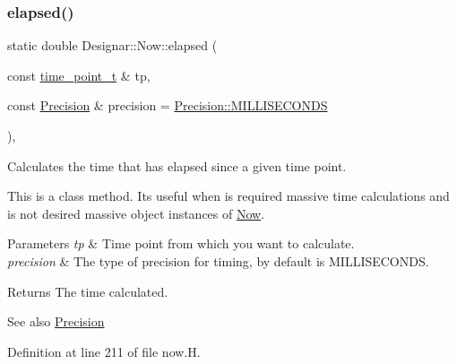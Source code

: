 \mbox{\label{class_designar_1_1_now_a04cc67e3245b662b33b25a6eefe7e957}} 
\subsubsection{\texorpdfstring{elapsed()}{elapsed()}\hspace{0.1cm}{\footnotesize\ttfamily [2/2]}}
{\footnotesize\ttfamily static double Designar\+::\+Now\+::elapsed (\begin{DoxyParamCaption}\item[{const \hyperlink{namespace_designar_a0edbd598eadb672df2c70e5af4dfccee}{time\+\_\+point\+\_\+t} \&}]{tp,  }\item[{const \hyperlink{class_designar_1_1_now_a3c9f5e57907c88cbe63c70a64638c072}{Precision} \&}]{precision = {\ttfamily \hyperlink{class_designar_1_1_now_a3c9f5e57907c88cbe63c70a64638c072ab4fd5e5c06e72437a57379576df36936}{Precision\+::\+M\+I\+L\+L\+I\+S\+E\+C\+O\+N\+DS}} }\end{DoxyParamCaption})\hspace{0.3cm}{\ttfamily [inline]}, {\ttfamily [static]}}

Calculates the time that has elapsed since a given time point.

This is a class method. It\textquotesingle{}s useful when is required massive time calculations and is not desired massive object instances of \hyperlink{class_designar_1_1_now}{Now}.


\begin{DoxyParams}{Parameters}
{\em tp} & Time point from which you want to calculate. \\
\hline
{\em precision} & The type of precision for timing, by default is M\+I\+L\+L\+I\+S\+E\+C\+O\+N\+DS. \\
\hline
\end{DoxyParams}
\begin{DoxyReturn}{Returns}
The time calculated. 
\end{DoxyReturn}
\begin{DoxySeeAlso}{See also}
\hyperlink{class_designar_1_1_now_a3c9f5e57907c88cbe63c70a64638c072}{Precision} 
\end{DoxySeeAlso}


Definition at line 211 of file now.\+H.

\mbox{\label{class_designar_1_1_now_a5f1a92bbd3bc6777749a0794d42b67c6}} 
